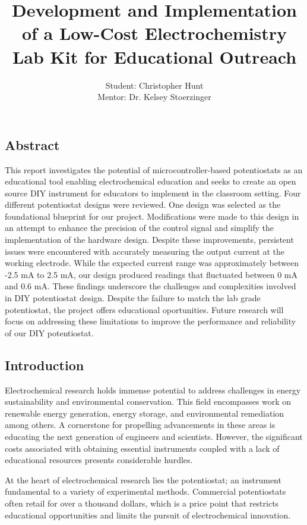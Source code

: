 \documentclass{article}
\title{\textcolor{mycolor}{\textbf{{\huge Development and Implementation of a Low-Cost Electrochemistry Lab Kit for Educational Outreach}}}}
\author{Student: Christopher Hunt \\ Mentor: Dr. Kelsey Stoerzinger}
\date{}
\begin{document}
\pagestyle{fancy}
\fancyhf{}
\rfoot{}
\rhead{\thepage}
\maketitle


\subsection*{Abstract}


This report investigates the potential of microcontroller-based potentiostats as an educational tool enabling electrochemical education and seeks to create an open source DIY instrument for educators to implement in the classroom setting. Four different potentiostat designs were reviewed. One design was selected as the foundational blueprint for our project. Modifications were made to this design in an attempt to enhance the precision of the control signal and simplify the implementation of the hardware design. Despite these improvements, persistent issues were encountered with accurately measuring the output current at the working electrode. While the expected current range was approximately between -2.5 mA to 2.5 mA, our design produced readings that fluctuated between 0 mA and 0.6 mA. These findings underscore the challenges and complexities involved in DIY potentiostat design. Despite the failure to match the lab grade potentiostat, the project offers educational oportunities. Future research will focus on addressing these limitations to improve the performance and reliability of our DIY potentiostat.


\subsection*{Introduction}
Electrochemical research holds immense potential to address challenges in energy sustainability and environmental conservation. This field encompasses work on renewable energy generation, energy storage, and environmental remediation among others. A cornerstone for propelling advancements in these areas is educating the next generation of engineers and scientists. However, the significant costs associated with obtaining essential instruments coupled with a lack of educational resources presents considerable hurdles.


At the heart of electrochemical research lies the potentiostat; an instrument fundamental to a variety of experimental methods. Commercial potentiostats often retail for over a thousand dollars, which is a price point that restricts educational opportunities and limits the pursuit of electrochemical innovation.
\end{document}
